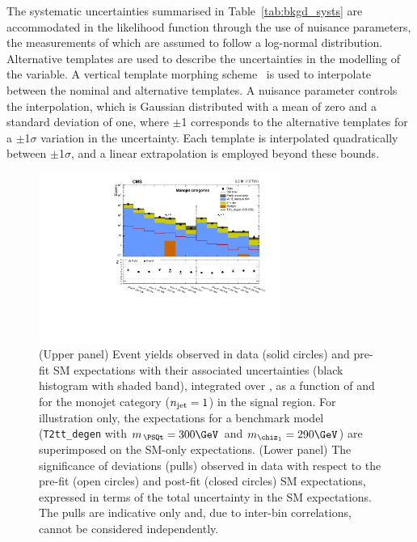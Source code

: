 The systematic uncertainties summarised in Table~\ref{tab:bkgd_systs}
are accommodated in the likelihood function through the use of
nuisance parameters, the measurements of which are assumed to follow a
log-normal distribution. Alternative templates are used to describe
the uncertainties in the modelling of the \HTmiss variable. A vertical
template morphing scheme~\cite{Prosper:2011zz} is used to interpolate
between the nominal and alternative \HTmiss templates. A nuisance
parameter controls the interpolation, which is Gaussian distributed
with a mean of zero and a standard deviation of one, where $\pm$1
corresponds to the alternative templates for a $\pm$1$\sigma$
variation in the uncertainty. Each template is interpolated
quadratically between $\pm$1$\sigma$, and a linear extrapolation is
employed beyond these bounds.

\begin{figure}[!t]
  \begin{center}
    \includegraphics[width=0.7\textwidth]{figures/result/v3/summaryPlot_Monojet_prefit_overlay_fit_b}
    \caption{(Upper panel) Event yields observed in data (solid circles)
      and pre-fit SM expectations with their associated
      uncertainties (black histogram with shaded band), integrated
      over \HTmiss, as a function of \nb and \scalht for the monojet
      category ($n_{\text{jet}} = 1$) in the signal region. For illustration
      only, the expectations for a benchmark model
      (\texttt{T2tt\_degen} with $m_{\,\PSQt} = 300\GeV$ and
      $m_{\chiz_1} = 290\GeV$) are superimposed on the SM-only
      expectations. (Lower panel) The significance of deviations
      (pulls) observed in data with respect to the pre-fit (open
      circles) and post-fit (closed circles) SM expectations,
      expressed in terms of the total uncertainty in the SM
      expectations. The pulls are indicative only and, due to
      inter-bin correlations, cannot be considered independently.}  
    \label{fig:mono}
  \end{center}
\end{figure}

